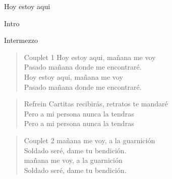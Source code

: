 \begin{song}[huayno]{Hoy estoy aqui}

\begin{instrumental}{Intro}
\measure{}\measure{}\measure{}\measure{}\measure{}
\measure{}\measure{}\measure{}\measure{}\measure{}
\measure{}
\end{instrumental}

\begin{instrumental}{Intermezzo}
\measure{}\measure{}\measure{}\measure{}\measure{}\measure{}\measure{}
\measure{}\measure{}\measure{}\measure{}\measure{}\measure{}\measure{}\measure{}
\measure{}\measure{}
\measure{}\measure{}
\end{instrumental}

\begin{verse}{Couplet 1}
Hoy estoy aqui, ma\~{n}ana me voy\\
Pasado ma\~{n}ana donde me encontraré.\\
Hoy estoy aqui, ma\~{n}ana me voy\\
Pasado ma\~{n}ana donde me encontraré.\phantom{xxxx}\phantom{xxx}\phantom{xxxx}\phantom{xxx}
\end{verse}

\begin{verse}{Refrein}
Cartitas recibir\'{a}s, \hspace{5em} retratos te mandaré \\
Pero a mi persona nunca la tendras\\
Pero a mi persona nunca la tendras\phantom{xxx}\phantom{xxxx}\phantom{xxx}
\end{verse}
\begin{verse}{Couplet 2}
ma\~{n}ana me voy, a la guarnici\'{o}n\\
Soldado ser\'{e}, dame tu bendici\'{o}n.\\
ma\~{n}ana me voy, a la guarnici\'{o}n\\
Soldado ser\'{e}, dame tu bendici\'{o}n. \phantom{xxxx}\phantom{xxx}\phantom{xxxx}\phantom{xxx}
\end{verse}


\end{song}
